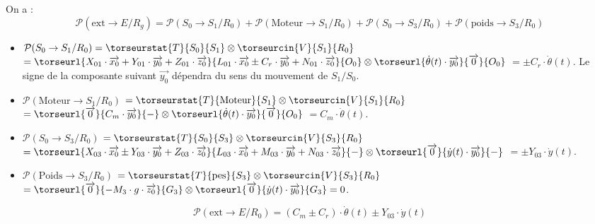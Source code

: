 \begin{multicols}{2}
\ifprof\begin{corrige}
On a : 
$$
\mathcal{P}(\text{ext}\rightarrow E/R_g)=\mathcal{P}(S_0 \rightarrow S_1/R_0)+\mathcal{P}(\text{Moteur}\rightarrow S_1/R_0)
+\mathcal{P}(S_0 \rightarrow S_3/R_0)+\mathcal{P}(\text{poids} \rightarrow S_3/R_0)
$$ 
\begin{itemize}
\item $\mathcal{P}(S_0 \rightarrow S_1/R_0)=\torseurstat{T}{S_0}{S_1}\otimes \torseurcin{V}{S_1}{R_0}$
$=\torseurl{X_{01}\cdot \overrightarrow{x_0}+Y_{01}\cdot \overrightarrow{y_0}+Z_{01}\cdot \overrightarrow{z_0}}{L_{01}\cdot \overrightarrow{x_0} \pm C_r\cdot \overrightarrow{y_0}+N_{01}\cdot \overrightarrow{z_0}}{O_0}
\otimes
\torseurl{\dot{\theta}(t)\cdot \overrightarrow{y_0}}{\overrightarrow{0}}{O_0}$
$=\pm C_r\cdot \dot{\theta}(t)$. 
Le signe de la composante suivant $\overrightarrow{y_0}$ dépendra du sens du mouvement de $S_1/S_0$.
\item $\mathcal{P}(\text{Moteur} \rightarrow S_1/R_0)$ $=\torseurstat{T}{\text{Moteur}}{S_1}\otimes \torseurcin{V}{S_1}{R_0}$
$=\torseurl{\overrightarrow{0}}{C_m\cdot \overrightarrow{y_0}}{-}
\otimes
\torseurl{\dot{\theta}(t)\cdot \overrightarrow{y_0}}{\overrightarrow{0}}{O_0}$
$=C_m\cdot \dot{\theta}(t)$.
\item $
\mathcal{P}(S_0 \rightarrow S_3/R_0)$ $=\torseurstat{T}{S_0}{S_3}\otimes \torseurcin{V}{S_3}{R_0}$
$=\torseurl{X_{03}\cdot \overrightarrow{x_0}\pm Y_{03}\cdot \overrightarrow{y_0}+Z_{03}\cdot \overrightarrow{z_0}}{L_{03}\cdot \overrightarrow{x_0} + M_{03}\cdot \overrightarrow{y_0}+N_{03}\cdot \overrightarrow{z_0}}{-}
\otimes
\torseurl{\overrightarrow{0}}{\dot{y}(t)\cdot \overrightarrow{y_0}}{-}$
$=\pm Y_{03}\cdot \dot{y}(t)$.
\item $\mathcal{P}(\text{Poids} \rightarrow S_3/R_0) $
$=\torseurstat{T}{\text{pes}}{S_3}\otimes \torseurcin{V}{S_3}{R_0}$
 $=\torseurl{\overrightarrow{0}}{-M_3\cdot g\cdot \overrightarrow{z_0}}{G_3}
\otimes
\torseurl{\overrightarrow{0}}{\dot{y}(t)\cdot \overrightarrow{y_0}}{G_3}=0$.
\end{itemize}

$$\mathcal{P}(\text{ext}\rightarrow E/R_0)=\left(C_m\pm C_r\right)\cdot \dot{\theta}(t)\pm Y_{03}\cdot \dot{y}(t)$$
\end{corrige}\else\fi




\end{multicols}
